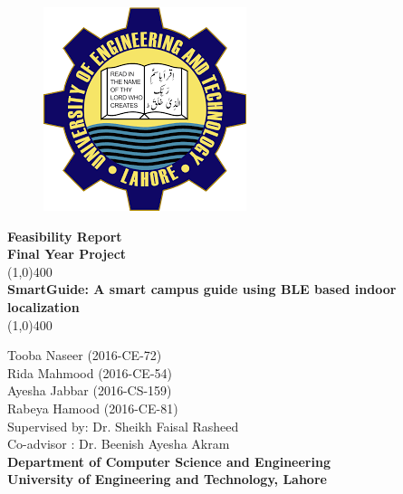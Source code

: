 \documentclass{article}
\begin{document}
\begin{titlepage}
\begin{center}
\vspace*{1cm}
\begin{figure}[h!]
\centering
\includegraphics[scale=0.5]{logo}
\end{figure}
\Large\textbf{Feasibility Report}\\
\Large\textbf{Final Year Project}\\
\vfill
\line(1,0){400}\\[1mm]
\huge{\textbf{SmartGuide: A smart campus guide using BLE based indoor localization}}\\[3mm]
\line(1,0){400}\\
\vfill

\large{Tooba Naseer  (2016-CE-72)}\\
\large{Rida Mahmood  (2016-CE-54)}\\
\large{Ayesha Jabbar  (2016-CS-159)}\\
\large{Rabeya Hamood  (2016-CE-81)}\\
\large{Supervised by: Dr. Sheikh Faisal Rasheed}\\
\large{Co-advisor : Dr. Beenish Ayesha Akram}\\
\large{\textbf{Department of Computer Science and Engineering}}\\
\large{\textbf{University of Engineering and Technology, Lahore}}\\
\end{center}
\end{titlepage}
\tableofcontents
\thispagestyle{empty}
\clearpage
\setcounter{page}{1}

\makeatletter
\newcommand{\heading}[1]%
{\par\vskip 1.5ex \@plus .2ex
 \hangindent=1em
 \noindent\makebox[1em][l]{$\,\bullet$}\textbf{\large #1}%
\par\vskip 1.5ex \@plus .2ex
\@afterheading}
\makeatother
\end{document}
